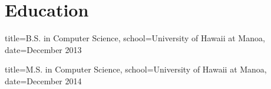 \documentclass{resume}
\begin{document}

\makeheader

\section*{Education}
\begin{degree}{title=B.S. in Computer Science,
               school=University of Hawaii at Manoa,
               date=December 2013}

\end{degree}

\begin{degree}{title=M.S. in Computer Science,
               school=University of Hawaii at Manoa,
               date=December 2014}

\end{degree}
\end{document}

